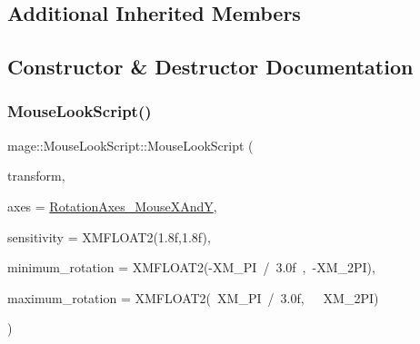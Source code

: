 \subsection*{Additional Inherited Members}


\subsection{Constructor \& Destructor Documentation}
\hypertarget{classmage_1_1_mouse_look_script_a21944edcaaafae45d19e82ecbebbff7c}{}\label{classmage_1_1_mouse_look_script_a21944edcaaafae45d19e82ecbebbff7c} 
\subsubsection{\texorpdfstring{Mouse\+Look\+Script()}{MouseLookScript()}\hspace{0.1cm}{\footnotesize\ttfamily [1/3]}}
{\footnotesize\ttfamily mage\+::\+Mouse\+Look\+Script\+::\+Mouse\+Look\+Script (\begin{DoxyParamCaption}\item[{\hyperlink{structmage_1_1_transform}{Transform} $\ast$}]{transform,  }\item[{\hyperlink{namespacemage_a548e5c31b08a1078841ed21948f5bf4c}{Rotation\+Axes}}]{axes = {\ttfamily \hyperlink{namespacemage_a548e5c31b08a1078841ed21948f5bf4ca6b0dd5cb81f83efb4c2b36456d84750d}{Rotation\+Axes\+\_\+\+Mouse\+X\+AndY}},  }\item[{const X\+M\+F\+L\+O\+A\+T2 \&}]{sensitivity = {\ttfamily XMFLOAT2(1.8f,1.8f)},  }\item[{const X\+M\+F\+L\+O\+A\+T2 \&}]{minimum\+\_\+rotation = {\ttfamily XMFLOAT2(-\/XM\+\_\+PI~/~3.0f~,~-\/XM\+\_\+2PI)},  }\item[{const X\+M\+F\+L\+O\+A\+T2 \&}]{maximum\+\_\+rotation = {\ttfamily XMFLOAT2(~XM\+\_\+PI~/~3.0f,~~~XM\+\_\+2PI)} }\end{DoxyParamCaption})\hspace{0.3cm}{\ttfamily [explicit]}}

\hypertarget{classmage_1_1_mouse_look_script_a54bd09419068ab61c4dd6fda412771d3}{}\label{classmage_1_1_mouse_look_script_a54bd09419068ab61c4dd6fda412771d3} 
